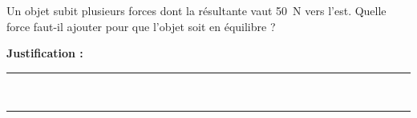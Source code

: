 Un objet subit plusieurs forces dont la résultante vaut \qty{50}{N} vers l'est. Quelle force faut-il ajouter pour que l'objet soit en équilibre ?

\choices

\noindent\textbf{Justification :} \hrulefill \\[2.5ex]
\rule{\linewidth}{0.4pt} \\[2.5ex]
\rule{\linewidth}{0.4pt}
\vfill

